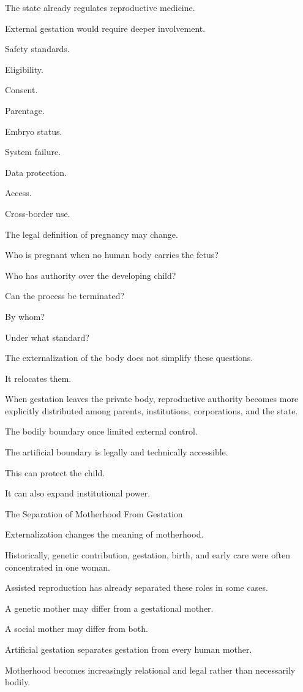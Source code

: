 The state already regulates reproductive medicine.

External gestation would require deeper involvement.

Safety standards.

Eligibility.

Consent.

Parentage.

Embryo status.

System failure.

Data protection.

Access.

Cross-border use.

The legal definition of pregnancy may change.

Who is pregnant when no human body carries the fetus?

Who has authority over the developing child?

Can the process be terminated?

By whom?

Under what standard?

The externalization of the body does not simplify these questions.

It relocates them.

When gestation leaves the private body, reproductive authority becomes more explicitly distributed among parents, institutions, corporations, and the state.

The bodily boundary once limited external control.

The artificial boundary is legally and technically accessible.

This can protect the child.

It can also expand institutional power.

The Separation of Motherhood From Gestation

Externalization changes the meaning of motherhood.

Historically, genetic contribution, gestation, birth, and early care were often concentrated in one woman.

Assisted reproduction has already separated these roles in some cases.

A genetic mother may differ from a gestational mother.

A social mother may differ from both.

Artificial gestation separates gestation from every human mother.

Motherhood becomes increasingly relational and legal rather than necessarily bodily.

